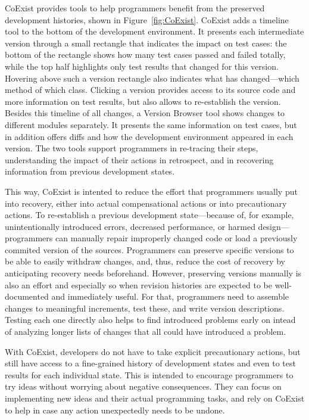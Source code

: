 CoExist provides tools to help programmers benefit from the preserved development histories, shown in Figure~\ref{fig:CoExist}.
CoExist adds a timeline tool to the bottom of the development environment.
It presents each intermediate version through a small rectangle that indicates the impact on test cases: the bottom of the rectangle shows how many test cases passed and failed totally, while the top half highlights only test results that changed for this version.
Hovering above such a version rectangle also indicates what has changed---which method of which class.
Clicking a version provides access to its source code and more information on test results, but also allows to re-establish the version.
Besides this timeline of all changes, a Version Browser tool shows changes to different modules separately.
It presents the same information on test cases, but in addition offers diffs and how the development environment appeared in each version.
The two tools support programmers in re-tracing their steps, understanding the impact of their actions in retrospect, and in recovering information from previous development states.

This way, CoExist is intented to reduce the effort that programmers usually put into recovery, either into actual compensational actions or into precautionary actions.
To re-establish a previous development state---because of, for example, unintentionally introduced errors, decreased performance, or harmed design---programmers can manually repair improperly changed code or load a previously commited version of the sources.
Programmers can preserve specific versions to be able to easily withdraw changes, and, thus, reduce the cost of recovery by anticipating recovery needs beforehand.
However, preserving versions manually is also an effort and especially so when revision histories are expected to be well-documented and immediately useful.
For that, programmers need to assemble changes to meaningful increments, test these, and write version descriptions.
Testing each one directly also helps to find introduced problems early on intead of analyzing longer lists of changes that all could have introduced a problem.

With CoExist, developers do not have to take explicit precautionary actions, but still have access to a fine-grained history of development states and even to test results for each individual state.
This is intended to encourage programmers to try ideas without worrying about negative consequences.
They can focus on implementing new ideas and their actual programming tasks, and rely on CoExist to help in case any action unexpectedly needs to be undone.


